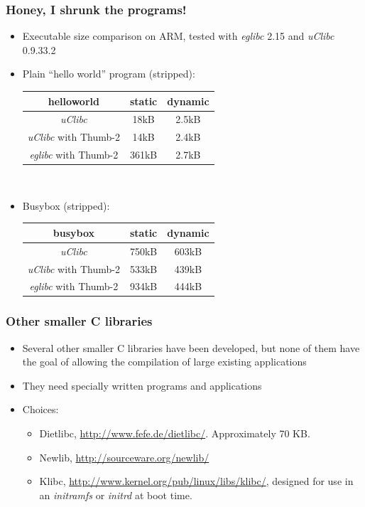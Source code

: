 \begin{frame}
  \frametitle{Honey, I shrunk the programs!}
  \begin{itemize}
  \item Executable size comparison on ARM, tested with {\em eglibc}
  2.15 and {\em uClibc} 0.9.33.2
  \item Plain ``hello world'' program (stripped): \\
    \begin{tabular}{| c || c | c |} \hline
    helloworld & static & dynamic \\ \hline
    {\em uClibc} & 18kB & 2.5kB \\
    {\em uClibc} with Thumb-2 & 14kB & 2.4kB \\
    {\em eglibc} with Thumb-2 & 361kB & 2.7kB \\ \hline
    \end{tabular} \\
  \item Busybox (stripped): \\
    \begin{tabular}{| c || c | c |} \hline
    busybox & static & dynamic \\ \hline
    {\em uClibc} & 750kB & 603kB \\
    {\em uClibc} with Thumb-2 & 533kB & 439kB \\
    {\em eglibc} with Thumb-2 & 934kB & 444kB \\ \hline
    \end{tabular}
  \end{itemize}
\end{frame}

\begin{frame}
  \frametitle{Other smaller C libraries}
  \begin{itemize}
  \item Several other smaller C libraries have been developed, but
    none of them have the goal of allowing the compilation of large
    existing applications
  \item They need specially written programs and applications
  \item Choices:
    \begin{itemize}
    \item Dietlibc, \url{http://www.fefe.de/dietlibc/}. Approximately
      70 KB.
    \item Newlib, \url{http://sourceware.org/newlib/}
    \item Klibc, \url{http://www.kernel.org/pub/linux/libs/klibc/},
      designed for use in an {\em initramfs} or {\em initrd} at boot
      time.
    \end{itemize}
  \end{itemize}
\end{frame}
